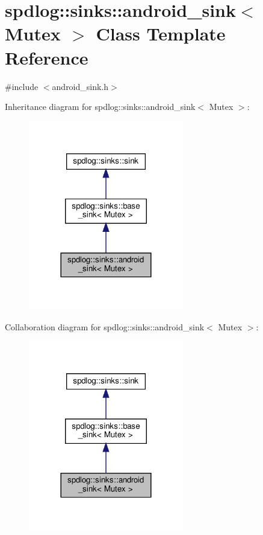 \hypertarget{classspdlog_1_1sinks_1_1android__sink}{}\section{spdlog\+:\+:sinks\+:\+:android\+\_\+sink$<$ Mutex $>$ Class Template Reference}
\label{classspdlog_1_1sinks_1_1android__sink}


{\ttfamily \#include $<$android\+\_\+sink.\+h$>$}



Inheritance diagram for spdlog\+:\+:sinks\+:\+:android\+\_\+sink$<$ Mutex $>$\+:
\nopagebreak
\begin{figure}[H]
\begin{center}
\leavevmode
\includegraphics[width=192pt]{classspdlog_1_1sinks_1_1android__sink__inherit__graph}
\end{center}
\end{figure}


Collaboration diagram for spdlog\+:\+:sinks\+:\+:android\+\_\+sink$<$ Mutex $>$\+:
\nopagebreak
\begin{figure}[H]
\begin{center}
\leavevmode
\includegraphics[width=192pt]{classspdlog_1_1sinks_1_1android__sink__coll__graph}
\end{center}
\end{figure}
